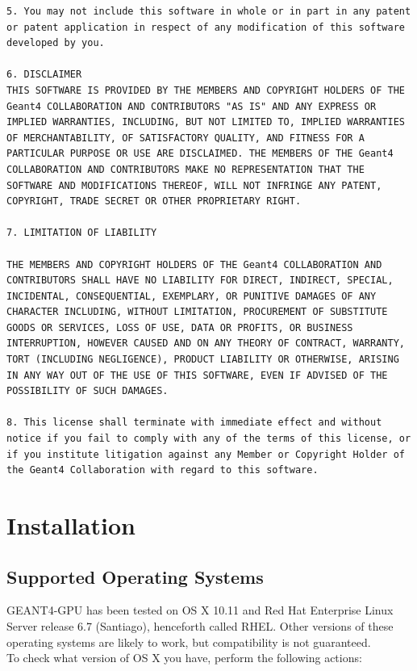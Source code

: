 \documentclass[12pt]{article}
\begin{document}
\begin{lstlisting}
5. You may not include this software in whole or in part in any patent or patent application in respect of any modification of this software developed by you.

6. DISCLAIMER
THIS SOFTWARE IS PROVIDED BY THE MEMBERS AND COPYRIGHT HOLDERS OF THE Geant4 COLLABORATION AND CONTRIBUTORS "AS IS" AND ANY EXPRESS OR IMPLIED WARRANTIES, INCLUDING, BUT NOT LIMITED TO, IMPLIED WARRANTIES OF MERCHANTABILITY, OF SATISFACTORY QUALITY, AND FITNESS FOR A PARTICULAR PURPOSE OR USE ARE DISCLAIMED. THE MEMBERS OF THE Geant4 COLLABORATION AND CONTRIBUTORS MAKE NO REPRESENTATION THAT THE SOFTWARE AND MODIFICATIONS THEREOF, WILL NOT INFRINGE ANY PATENT, COPYRIGHT, TRADE SECRET OR OTHER PROPRIETARY RIGHT.

7. LIMITATION OF LIABILITY

THE MEMBERS AND COPYRIGHT HOLDERS OF THE Geant4 COLLABORATION AND CONTRIBUTORS SHALL HAVE NO LIABILITY FOR DIRECT, INDIRECT, SPECIAL, INCIDENTAL, CONSEQUENTIAL, EXEMPLARY, OR PUNITIVE DAMAGES OF ANY CHARACTER INCLUDING, WITHOUT LIMITATION, PROCUREMENT OF SUBSTITUTE GOODS OR SERVICES, LOSS OF USE, DATA OR PROFITS, OR BUSINESS INTERRUPTION, HOWEVER CAUSED AND ON ANY THEORY OF CONTRACT, WARRANTY, TORT (INCLUDING NEGLIGENCE), PRODUCT LIABILITY OR OTHERWISE, ARISING IN ANY WAY OUT OF THE USE OF THIS SOFTWARE, EVEN IF ADVISED OF THE POSSIBILITY OF SUCH DAMAGES.

8. This license shall terminate with immediate effect and without notice if you fail to comply with any of the terms of this license, or if you institute litigation against any Member or Copyright Holder of the Geant4 Collaboration with regard to this software.
\end{lstlisting}
 
\section{Installation} %

\subsection{Supported Operating Systems} %
GEANT4-GPU has been tested on OS X 10.11 and Red Hat Enterprise Linux Server release 6.7 (Santiago), henceforth called RHEL. Other versions of these operating systems are likely to work, but compatibility is not guaranteed.\\

To check what version of OS X you have, perform the following actions:
\end{document}
